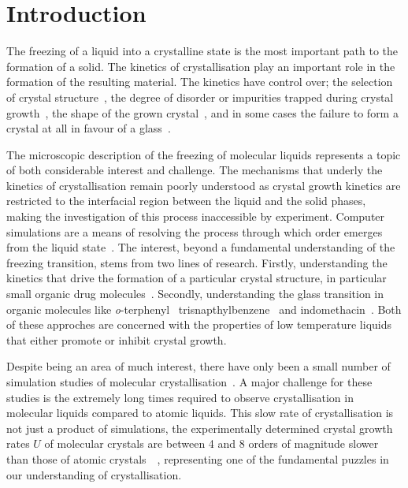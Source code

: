 \chapter {Introduction}
\label{sec:introduction}

The freezing of a liquid into a crystalline state is the most important path to the formation of a solid. The kinetics of crystallisation play an important role in the formation of the resulting material. The kinetics have control over; the selection of crystal structure~\cite{de-yoreo:03,lofton:05}, the degree of disorder or impurities trapped during crystal growth~\cite{chernov:77,malkin:99}, the shape of the grown crystal~\cite{bakar:09}, and in some cases the failure to form a crystal at all in favour of a glass~\cite{turnbull:69,uhlmann:72,debenedetti:01}.

The microscopic description of the freezing of molecular liquids represents a topic of both considerable interest and challenge. The mechanisms that underly the kinetics of crystallisation remain poorly understood as crystal growth kinetics are restricted to the interfacial region between the liquid and the solid phases, making the investigation of this process inaccessible by experiment. Computer simulations are a means of resolving the process through which order emerges from the liquid state~\cite{jackson:02,svishchev:94,tenwolde:96}. The interest, beyond a fundamental understanding of the freezing transition, stems from two lines of research. Firstly, understanding the kinetics that drive the formation of a particular crystal structure, in particular small organic drug molecules~\cite{childs:04}. Secondly, understanding the glass transition in organic molecules like \emph{o}-terphenyl~\cite{greet:67} trisnapthylbenzene~\cite{swallen:03} and indomethacin~\cite{hancock:00}. Both of these approches are concerned with the properties of low temperature liquids that either promote or inhibit crystal growth.

Despite being an area of much interest, there have only been a small number of simulation studies of molecular crystallisation~\cite{affouard:99,kammerer:97,moreno:05}. A major challenge for these studies is the extremely long times required to observe crystallisation in molecular liquids compared to atomic liquids. This slow rate of crystallisation is not just a product of simulations, the experimentally determined crystal growth rates $U$ of molecular crystals are between 4 and 8 orders of magnitude slower than those of atomic crystals~~\cite{orava:14}, representing one of the fundamental puzzles in our understanding of crystallisation.

